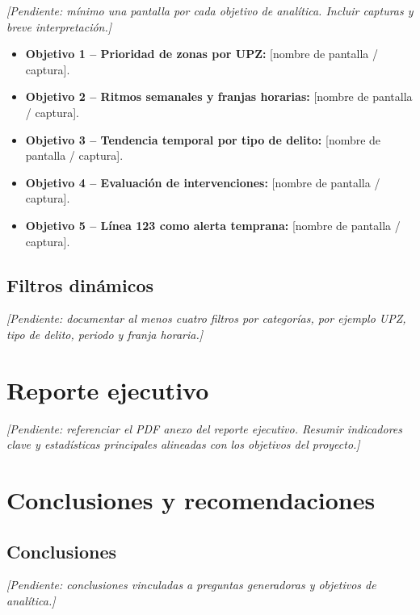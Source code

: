 \documentclass[12pt,letterpaper]{article}
\begin{document}
\textit{[Pendiente: mínimo una pantalla por cada objetivo de analítica. Incluir capturas y breve interpretación.]}
\begin{itemize}
    \item \textbf{Objetivo 1 -- Prioridad de zonas por UPZ:} [nombre de pantalla / captura].
    \item \textbf{Objetivo 2 -- Ritmos semanales y franjas horarias:} [nombre de pantalla / captura].
    \item \textbf{Objetivo 3 -- Tendencia temporal por tipo de delito:} [nombre de pantalla / captura].
    \item \textbf{Objetivo 4 -- Evaluación de intervenciones:} [nombre de pantalla / captura].
    \item \textbf{Objetivo 5 -- Línea 123 como alerta temprana:} [nombre de pantalla / captura].
\end{itemize}

\subsection{Filtros dinámicos}

\textit{[Pendiente: documentar al menos cuatro filtros por categorías, por ejemplo UPZ, tipo de delito, periodo y franja horaria.]}

\section{Reporte ejecutivo}

\textit{[Pendiente: referenciar el PDF anexo del reporte ejecutivo. Resumir indicadores clave y estadísticas principales alineadas con los objetivos del proyecto.]}

\section{Conclusiones y recomendaciones}

\subsection{Conclusiones}

\textit{[Pendiente: conclusiones vinculadas a preguntas generadoras y objetivos de analítica.]}
\end{document}
